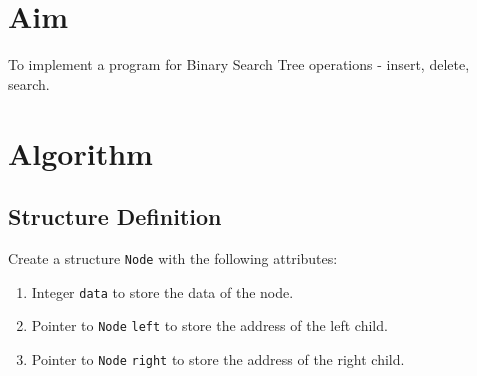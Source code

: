 
\section{Aim}
To implement a program for Binary Search Tree operations -  insert, delete, search.

\section{Algorithm}
 {\selectfont

  \subsection{Structure Definition}
  Create a structure \texttt{Node} with the following attributes:
  \begin{enumerate}[label=\arabic*:,left=0pt]
    \item Integer \texttt{data} to store the data of the node.
    \item Pointer to \texttt{Node} \texttt{left} to store the address of the left child.
    \item Pointer to \texttt{Node} \texttt{right} to store the address of the right child.
  \end{enumerate}

}
